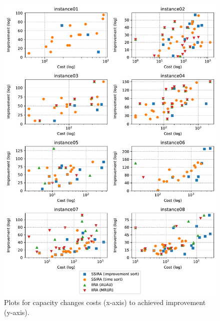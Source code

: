 \begin{figure}[t]
    \centering
    \includegraphics[width=\textwidth]{img/exp_aggregated_cost_improv.pdf}
    \caption{
        Plots for capacity changes costs (x-axis) to achieved improvement (y-axis).
        }
    \label{fig:exp/cost-improv}
\end{figure}

